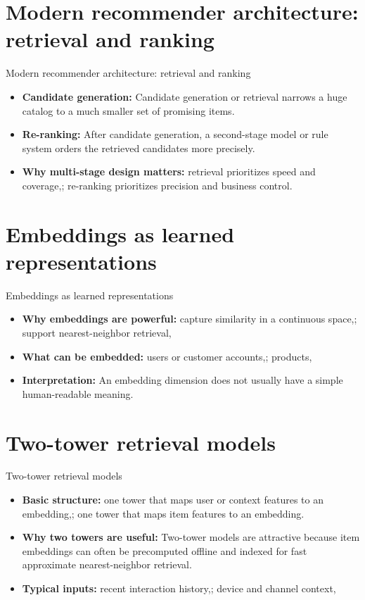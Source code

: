 \documentclass[aspectratio=169]{beamer}
\begin{document}
\section{Modern recommender architecture: retrieval and ranking}

\begin{frame}{Modern recommender architecture: retrieval and ranking}
  \begin{itemize}
    \item \textbf{Candidate generation:} Candidate generation or retrieval narrows a huge catalog to a much smaller set of promising items.
    \item \textbf{Re-ranking:} After candidate generation, a second-stage model or rule system orders the retrieved candidates more precisely.
    \item \textbf{Why multi-stage design matters:} retrieval prioritizes speed and coverage,; re-ranking prioritizes precision and business control.
  \end{itemize}
\end{frame}

\section{Embeddings as learned representations}

\begin{frame}{Embeddings as learned representations}
  \begin{itemize}
    \item \textbf{Why embeddings are powerful:} capture similarity in a continuous space,; support nearest-neighbor retrieval,
    \item \textbf{What can be embedded:} users or customer accounts,; products,
    \item \textbf{Interpretation:} An embedding dimension does not usually have a simple human-readable meaning.
  \end{itemize}
\end{frame}

\section{Two-tower retrieval models}

\begin{frame}{Two-tower retrieval models}
  \begin{itemize}
    \item \textbf{Basic structure:} one tower that maps user or context features to an embedding,; one tower that maps item features to an embedding.
    \item \textbf{Why two towers are useful:} Two-tower models are attractive because item embeddings can often be precomputed offline and indexed for fast approximate nearest-neighbor retrieval.
    \item \textbf{Typical inputs:} recent interaction history,; device and channel context,
  \end{itemize}
\end{frame}
\end{document}
